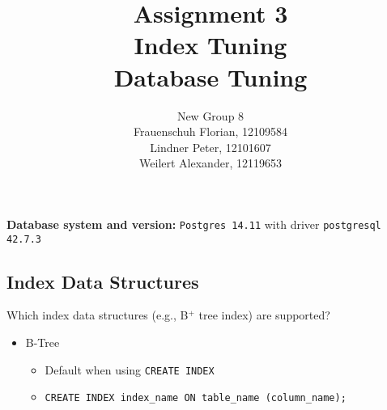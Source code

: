 \documentclass[11pt]{scrartcl}
\title{
  \textbf{\large Assignment 3} \\
  Index Tuning \\
  {\large Database Tuning}}
\author{
  New Group 8 \\
  \large Frauenschuh Florian, 12109584 \\
  \large Lindner Peter, 12101607 \\
  \large Weilert Alexander, 12119653
}
\begin{document}
\maketitle

\textbf{Database system and version:} \texttt{Postgres 14.11} with driver \texttt{postgresql 42.7.3} \\

\subsection{Index Data Structures}

Which index data structures (e.g., B$^+$ tree index) are supported?

\begin{itemize}
  \item B-Tree \cite{PostgreSQL2024IndexTypes}
  \begin{itemize}
    \item Default when using \texttt{CREATE INDEX}
    \item   \begin{lstlisting}[style=dbtsql]
CREATE INDEX index_name ON table_name (column_name);
    \end{lstlisting}
  \end{itemize}


\end{itemize}
\end{document}
